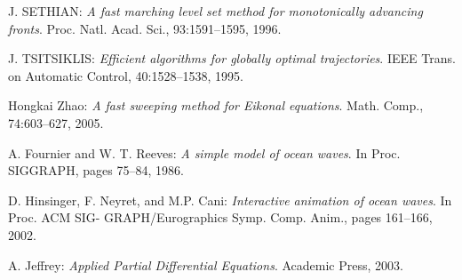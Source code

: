 \documentclass[11pt]{report}
\begin{document}
\begin{thebibliography}{2}
J. SETHIAN:
\textit{A fast marching level set method for monotonically advancing fronts}.
Proc. Natl. Acad. Sci., 93:1591–1595, 1996.

J. TSITSIKLIS:
\textit{Efficient algorithms for globally optimal trajectories}.
IEEE Trans. on Automatic Control, 40:1528–1538, 1995.

Hongkai Zhao:
\textit{A fast sweeping method for Eikonal equations}.
Math. Comp., 74:603–627, 2005.

A. Fournier and W. T. Reeves:
\textit{A simple model of ocean waves}. In Proc. SIGGRAPH, pages 75–84, 1986.

D. Hinsinger, F. Neyret, and M.P. Cani:
\textit{Interactive animation of ocean waves}. In Proc. ACM SIG-
GRAPH/Eurographics Symp. Comp. Anim., pages 161–166, 2002.

A. Jeffrey:
\textit{Applied Partial Differential Equations}. Academic Press, 2003.


\end{thebibliography}
\end{document}

